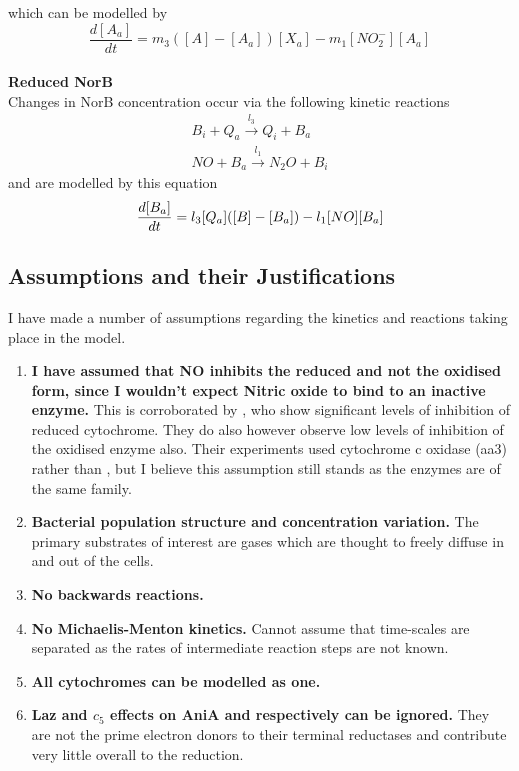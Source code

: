 which can be modelled by
\begin{equation}
\frac{d[A_a]}{dt} = m_3([A] - [A_a])[X_a]- m_{1}[NO_2^-][A_a]
\label{eq:active_ania}
\end{equation}
\\{\bf Reduced NorB}\\
Changes in NorB concentration occur via the following kinetic reactions
\begin{equation*}
\begin{gathered}
B_i + Q_a \xrightarrow{l_3} Q_i + B_a \\
NO + B_a \xrightarrow{l_1} N_{2}O + B_i
\end{gathered}
\end{equation*}
and are modelled by this equation
\begin{equation}
\frac{d[B_a]}{dt} = l_3[Q_a]([B] - [B_a]) - l_1[NO][B_a]\\
\label{eq:active_norb}
\end{equation}


\subsection{Assumptions and their Justifications}
I have made a number of assumptions regarding the kinetics and reactions taking place in the model.
\begin{enumerate}
 \item {\bf I have assumed that NO inhibits the reduced \cbbthree{} and not the oxidised form, since I wouldn't expect Nitric oxide to bind to an inactive enzyme.} This is corroborated by \citet{Giuffre2000}, who show significant levels of inhibition of reduced cytochrome. They do also however observe low levels of inhibition of the oxidised enzyme also. Their experiments used cytochrome c oxidase (aa3) rather than \cbbthree{}, but I believe this assumption still stands as the enzymes are of the same family.
 \item {\bf Bacterial population structure and concentration variation.} The primary substrates of interest are gases which are thought to freely diffuse in and out of the cells.
 \item {\bf No backwards reactions.}
 \item {\bf No Michaelis-Menton kinetics.} Cannot assume that time-scales are separated as the rates of intermediate reaction steps are not known.
 \item {\bf All cytochromes can be modelled as one.}
 \item {\bf Laz and $c_5$ effects on AniA and \cbbthree{} respectively can be ignored.} They are not the prime electron donors to their terminal reductases and contribute very little overall to the reduction\cite{Deeudom2007}.
\end{enumerate}

